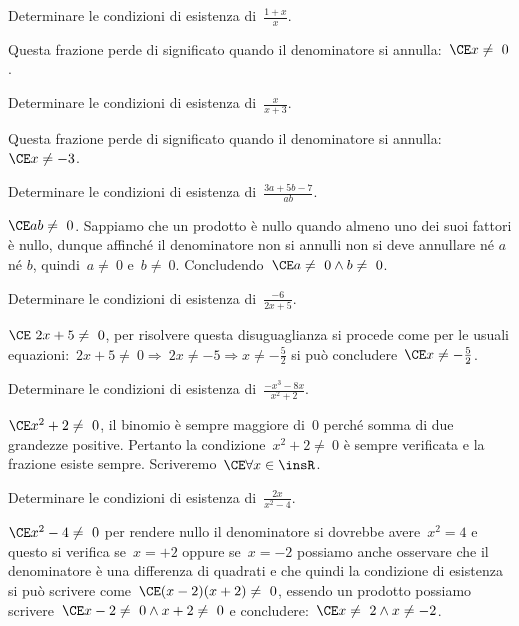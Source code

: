 \begin{exrig}
 \begin{esempio}
Determinare le condizioni di esistenza di~$\frac{1+x}{x}$.

Questa frazione perde di significato quando il denominatore si 
annulla:~$\CE x\neq~0$.
 \end{esempio}

 \begin{esempio}
Determinare le condizioni di esistenza di~$\frac{x}{x+3}$.

Questa frazione perde di significato quando il denominatore si 
annulla:~$\CE x\neq -3$.
 \end{esempio}

 \begin{esempio}
Determinare le condizioni di esistenza di~$\frac{3a+5b-7}{ab}$.

$\CE ab\neq~0$. Sappiamo che un prodotto è nullo quando almeno uno dei suoi 
fattori è nullo, dunque affinché il denominatore non si annulli non si deve 
annullare né $a$ né $b$,
quindi~$a\neq~0$ e~$b\neq~0$. Concludendo~$\CE a\neq~0\wedge b\neq~0$.
 \end{esempio}

 \begin{esempio}
Determinare le condizioni di esistenza di~$\frac{-6}{2x+5}$.

$\CE~2x+5\neq~0$, per risolvere questa disuguaglianza si procede come per le 
usuali 
equazioni:~$2x+5\neq~0 \Rightarrow~2x\neq -5\Rightarrow x\neq -{\frac{5}{2}}$ 
si può concludere~$\CE x\neq -{\frac{5}{2}}$.
 \end{esempio}

 \begin{esempio}
Determinare le condizioni di esistenza di~$\frac{-x^{3}-8x}{x^{2}+2}$.

$\CE x^{2}+2\neq~0$, il binomio è sempre maggiore di~$0$ perché somma di due 
grandezze positive.
Pertanto la condizione~$x^{2}+2\neq~0$ è sempre verificata e la frazione 
esiste sempre. Scriveremo~$\CE \forall x\in \insR$.
 \end{esempio}

 \begin{esempio}
Determinare le condizioni di esistenza di~$\frac{2x}{x^{2}-4}$.

$\CE x^{2}-4\neq~0$ per rendere nullo il denominatore si dovrebbe 
avere~$x^2 = 4$ e questo si verifica se~$x = +2$
oppure se~$x = -2$ possiamo anche osservare che il denominatore è una 
differenza di quadrati e che quindi la
condizione di esistenza si può scrivere come~$\CE (x-2)(x+2)\neq~0$, essendo 
un prodotto possiamo
scrivere~$\CE x-2\neq~0\wedge x+2\neq~0$ e 
concludere:~$\CE x\neq~2\wedge x\neq -2$.
 \end{esempio}
\end{exrig}

